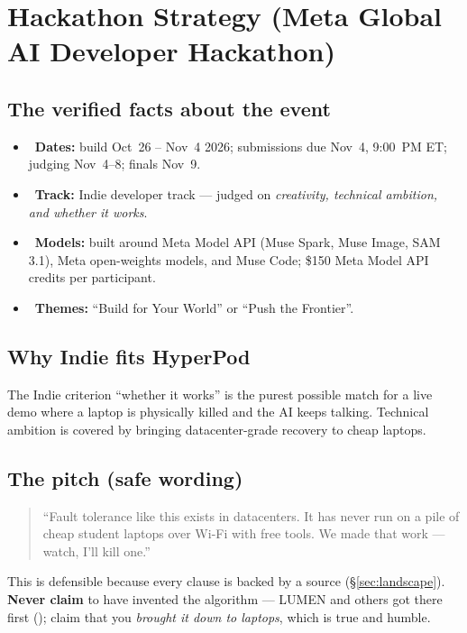 \section{Hackathon Strategy (Meta Global AI Developer Hackathon)}
\label{sec:hackathon}

\subsection{The verified facts about the event}
\begin{itemize}[leftmargin=1.4em,nosep]
  \item \VER\ \textbf{Dates:} build Oct~26 -- Nov~4 2026; submissions due Nov~4,
  9:00~PM ET; judging Nov~4--8; finals Nov~9.
  \item \VER\ \textbf{Track:} Indie developer track --- judged on
  \emph{creativity, technical ambition, and whether it works}.
  \item \VER\ \textbf{Models:} built around Meta Model API (Muse Spark, Muse
  Image, SAM 3.1), Meta open-weights models, and Muse Code; \$150 Meta Model API
  credits per participant.
  \item \VER\ \textbf{Themes:} ``Build for Your World'' or ``Push the Frontier''.
\end{itemize}

\subsection{Why Indie fits HyperPod}
The Indie criterion ``whether it works'' is the purest possible match for a live
demo where a laptop is physically killed and the AI keeps talking. Technical
ambition is covered by bringing datacenter-grade recovery to cheap laptops.

\subsection{The pitch (safe wording)}
\begin{quote}
``Fault tolerance like this exists in datacenters. It has never run on a pile of
cheap student laptops over Wi-Fi with free tools. We made that work --- watch,
I'll kill one.''
\end{quote}
This is defensible because every clause is backed by a source
(\S\ref{sec:landscape}). \textbf{Never claim} to have invented the algorithm ---
LUMEN and others got there first (\VER); claim that you \emph{brought it down to
laptops}, which is true and humble.


